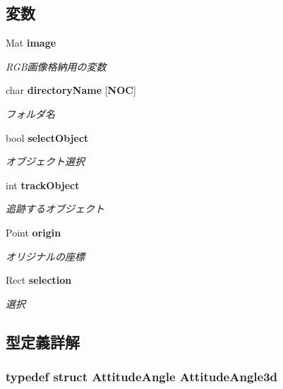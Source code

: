 \subsection*{変数}
\begin{DoxyCompactItemize}
\item 
Mat {\bf image}
\begin{DoxyCompactList}\small\item\em R\-G\-B画像格納用の変数 \end{DoxyCompactList}\item 
char {\bf directory\-Name} [{\bf N\-O\-C}]
\begin{DoxyCompactList}\small\item\em フォルダ名 \end{DoxyCompactList}\item 
bool {\bf select\-Object}
\begin{DoxyCompactList}\small\item\em オブジェクト選択 \end{DoxyCompactList}\item 
int {\bf track\-Object}
\begin{DoxyCompactList}\small\item\em 追跡するオブジェクト \end{DoxyCompactList}\item 
Point {\bf origin}
\begin{DoxyCompactList}\small\item\em オリジナルの座標 \end{DoxyCompactList}\item 
Rect {\bf selection}
\begin{DoxyCompactList}\small\item\em 選択 \end{DoxyCompactList}\end{DoxyCompactItemize}


\subsection{型定義詳解}
\subsubsection[{Attitude\-Angle3d}]{\setlength{\rightskip}{0pt plus 5cm}typedef struct {\bf Attitude\-Angle} {\bf Attitude\-Angle3d}}\label{_path_tracking_and_induction_of_the_robot_8hpp_a4860903646946a52474a935518d26b08}

